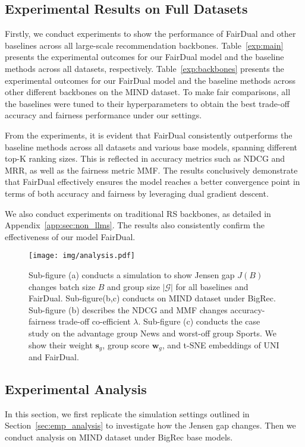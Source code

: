 \subsection{Experimental Results on Full Datasets}\label{sec:main_exp}
Firstly, we conduct experiments to show the performance of FairDual and other baselines across all large-scale recommendation backbones.
Table~\ref{exp:main} presents the experimental outcomes for our FairDual model and the baseline methods across all datasets, respectively. Table~\ref{exp:backbones} presents the experimental outcomes for our FairDual model and the baseline methods across other different backbones on the MIND dataset. 
To make fair comparisons, all the baselines were tuned to their hyperparameters to obtain the best trade-off accuracy and fairness performance under our settings.


From the experiments, it is evident that FairDual consistently outperforms the baseline methods across all datasets and various base models, spanning different top-K ranking sizes. This is reflected in accuracy metrics such as NDCG and MRR, as well as the fairness metric MMF. The results conclusively demonstrate that FairDual effectively ensures the model reaches a better convergence point in terms of both accuracy and fairness by leveraging dual gradient descent.

We also conduct experiments on traditional RS backbones, as detailed in Appendix~\ref{app:sec:non_llms}. The results also consistently confirm the effectiveness of our model FairDual.


\begin{figure}
    \centering
    \texttt{[image: img/analysis.pdf]}
    \caption{Sub-figure (a) conducts a simulation to show Jensen gap $J(B)$ changes \wrt batch size $B$ and group size $|\mathcal{G}|$ for all baselines and FairDual. Sub-figure(b,c) conducts on MIND dataset under BigRec. Sub-figure (b) describes the NDCG and MMF changes \wrt accuracy-fairness trade-off co-efficient $\lambda$. Sub-figure (c) conducts the case study on the advantage group News and worst-off group Sports. We show their weight $\bm{s}_g$, group score $\bm{w}_g$, and t-SNE embeddings of UNI and FairDual. }
    \label{fig:analysis}
    \vspace{-0.3cm}
\end{figure}

\subsection{Experimental Analysis}
In this section, we first replicate the simulation settings outlined in Section~\ref{sec:emp_analysis} to investigate how the Jensen gap changes. Then we conduct analysis on MIND dataset under BigRec base models.


